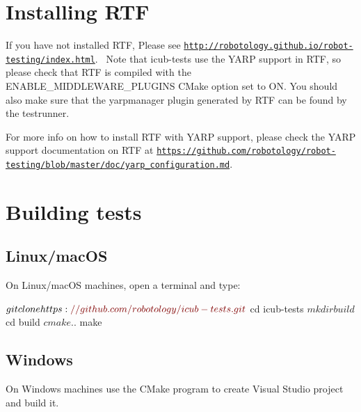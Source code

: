 \hypertarget{installation_installing_rtf}{}\section{Installing R\+TF}\label{installation_installing_rtf}
If you have not installed R\+TF, Please see \href{http://robotology.github.io/robot-testing/index.html}{\tt http\+://robotology.\+github.\+io/robot-\/testing/index.\+html}.~\newline
Note that {\ttfamily icub-\/tests} use the Y\+A\+RP support in R\+TF, so please check that R\+TF is compiled with the {\ttfamily E\+N\+A\+B\+L\+E\+\_\+\+M\+I\+D\+D\+L\+E\+W\+A\+R\+E\+\_\+\+P\+L\+U\+G\+I\+NS} C\+Make option set to ON. You should also make sure that the {\ttfamily yarpmanager} plugin generated by R\+TF can be found by the {\ttfamily testrunner}.~\newline


For more info on how to install R\+TF with Y\+A\+RP support, please check the Y\+A\+RP support documentation on R\+TF at \href{https://github.com/robotology/robot-testing/blob/master/doc/yarp_configuration.md}{\tt https\+://github.\+com/robotology/robot-\/testing/blob/master/doc/yarp\+\_\+configuration.\+md}.\hypertarget{installation_building_tests}{}\section{Building tests}\label{installation_building_tests}
\hypertarget{installation_building_tests_unix}{}\subsection{Linux/mac\+OS}\label{installation_building_tests_unix}
On Linux/mac\+OS machines, open a terminal and type\+: 
\begin{DoxyCode}
$ git clone https:\textcolor{comment}{//github.com/robotology/icub-tests.git}
$ cd icub-tests
$ mkdir build
$ cd build
$ cmake ..
$ make
\end{DoxyCode}
\hypertarget{installation_building_tests_win}{}\subsection{Windows}\label{installation_building_tests_win}
On Windows machines use the C\+Make program to create Visual Studio project and build it.


